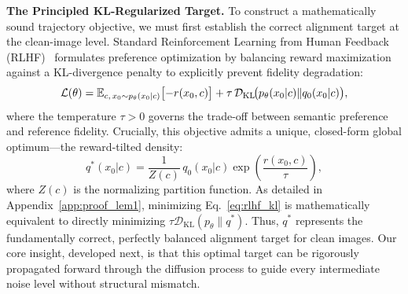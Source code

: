 \textbf{The Principled KL-Regularized Target.}
To construct a mathematically sound trajectory objective, we must first establish the correct alignment target at the clean-image level. Standard Reinforcement Learning from Human Feedback (RLHF)~\citep{christiano2017deep,ouyang2022training} formulates preference optimization by balancing reward maximization against a KL-divergence penalty to explicitly prevent fidelity degradation:
\begin{equation}
\mathcal{L}(\theta) = \mathbb{E}_{c,\, x_0 \sim p_\theta(x_0|c)} \bigl[-r(x_0, c)\bigr] + \tau\, \mathcal{D}_{\mathrm{KL}}\!\bigl(p_\theta(x_0|c) \| q_0(x_0|c)\bigr),
\label{eq:rlhf_kl}
\end{equation}
where the temperature $\tau>0$ governs the trade-off between semantic preference and reference fidelity. Crucially, this objective admits a unique, closed-form global optimum---the reward-tilted density:
\begin{equation}
q^*(x_0|c) = \frac{1}{Z(c)}\, q_0(x_0|c)\exp\!\left(\frac{r(x_0,c)}{\tau}\right),
\label{eq:reward_tilted_target}
\end{equation}
where $Z(c)$ is the normalizing partition function. As detailed in Appendix~\ref{app:proof_lem1}, minimizing Eq.~\eqref{eq:rlhf_kl} is mathematically equivalent to directly minimizing $\tau\mathcal{D}_{\mathrm{KL}}(p_\theta\|q^*)$. Thus, $q^*$ represents the fundamentally correct, perfectly balanced alignment target for clean images. Our core insight, developed next, is that this optimal target can be rigorously propagated forward through the diffusion process to guide every intermediate noise level without structural mismatch.
